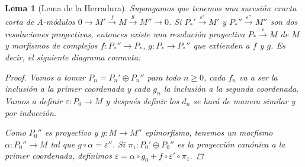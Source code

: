 \documentclass[12pt]{book}
\newtheorem{lem}[teo]{Lema}
\theoremstyle{definition}
\begin{document}
\begin{lem}[Lema de la Herradura]
Supongamos que tenemos una sucesión exacta corta de $A$-módulos $0\longrightarrow M'\stackrel{f}{\longrightarrow}M\stackrel{g}{\longrightarrow}M''\longrightarrow 0$. Si $P_*'\stackrel{\varepsilon'}{\longrightarrow}M'$ y $P_*''\stackrel{\varepsilon''}{\longrightarrow}M''$ son dos resoluciones proyectivas, entonces existe una resolución proyectiva $P_*\stackrel{\varepsilon}{\longrightarrow}M$ de $M$ y morfismos de complejos $f:P_*''\to P_*$, $g:P_*\to P_*''$ que extienden a $f$ y $g$. Es decir, el siguiente diagrama conmuta:  

\begin{center}\end{center}
\begin{proof}

Vamos a tomar $P_n = P_n'\oplus P_n''$ para todo $n\geq 0$, cada $f_n$ va a ser la inclusión a la primer coordenada y cada $g_n$ la inclusión a la segunda coordenada. Vamos a definir $\varepsilon:P_0\to M$ y después definir los $d_n$ se hará de manera similar y por inducción.

Como $P_0''$ es proyectivo y $g:M\to M''$ epimorfismo, tenemos un morfismo $\alpha:P_0''\to M$ tal que $g\circ \alpha = \varepsilon''$. Si $\pi_1:P_0'\oplus P_0''$ es la proyección canónica a la primer coordenada, definimos $\varepsilon = \alpha\circ g_0 + f\circ \varepsilon'\circ \pi_1$.


\end{proof}
\end{lem}
\end{document}
